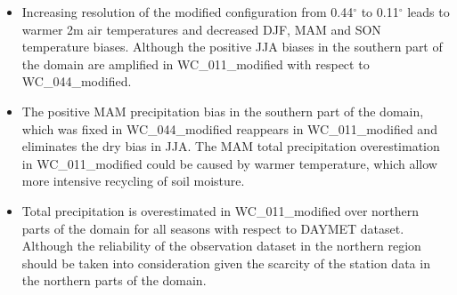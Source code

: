 \documentclass[a0b,landscape]{a0poster}
\begin{document}
\begin{multicols*}{4}
\noindent
\begin{minipage}[t]{\linewidth}
\centering
{}
\end{minipage}

\begin{itemize}
  \item Increasing resolution of the modified configuration from 0.44$^\circ$ to 0.11$^\circ$ leads to warmer 2m air temperatures and decreased DJF, MAM and SON temperature biases.
  Although the positive JJA biases in the southern part of the domain are amplified in WC\_011\_modified with respect to WC\_044\_modified.

  \item The positive MAM precipitation bias in the southern part of the domain,
        which was fixed in WC\_044\_modified reappears in WC\_011\_modified and
        eliminates the dry bias in JJA. The MAM total precipitation overestimation in WC\_011\_modified could
        be caused by warmer temperature, which allow more intensive recycling of soil moisture.

  \item Total precipitation is overestimated in WC\_011\_modified over northern parts of
        the domain for all seasons with respect to DAYMET dataset. Although the
        reliability of the observation dataset in the northern region should be taken
        into consideration given the scarcity of the station data in the northern parts
        of the domain.
\end{itemize}



\end{multicols*}
\end{document}
